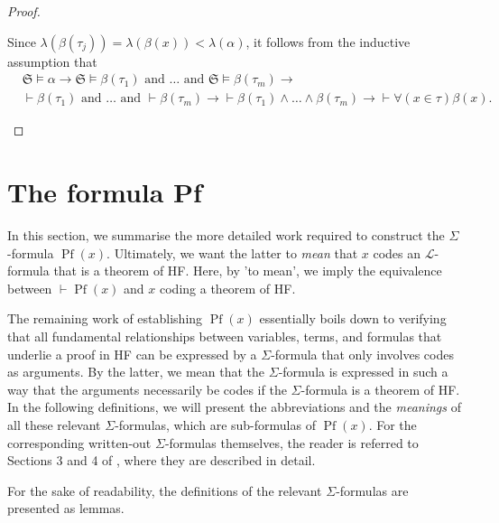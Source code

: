 \begin{proof}
\begin{itemize}
$$        $$
        Since $\lambda(\beta(\tau_j)) = \lambda(\beta(x)) < \lambda(\alpha)$, it follows 
        from the inductive assumption that
        \begin{equation*}
            \begin{split}
                & \mathfrak{S} \vDash \alpha \rightarrow 
                \mathfrak{S} \vDash \beta(\tau_1) \text{ and } \ldots \text{ and } 
                \mathfrak{S} \vDash \beta(\tau_m) \rightarrow \\
                &\vdash \beta(\tau_1) \text{ and } \ldots \text{ and } \vdash \beta(\tau_m) 
                \rightarrow
                \vdash \beta(\tau_1) \land \ldots \land \beta(\tau_m) \rightarrow
                \vdash \forall (x \in \tau) \beta(x).
            \end{split}
        \end{equation*}
    \end{itemize}
\end{proof}

\section{The formula Pf}

In this section, we summarise the more detailed work required to construct the 
$\Sigma$-formula $\operatorname{Pf}(x)$.
Ultimately, we want the latter to \textit{mean} that $x$ codes an $\mathcal{L}$-formula 
that is a theorem of HF.
Here, by 'to mean', we imply the equivalence between $\vdash \operatorname{Pf}(x)$ and
$x$ coding a theorem of HF.

The remaining work of establishing $\operatorname{Pf}(x)$ essentially boils down to verifying 
that all fundamental relationships between variables, terms, and formulas that 
underlie a proof in HF can be expressed by a $\Sigma$-formula that only involves codes as arguments.
By the latter, we mean that the $\Sigma$-formula is expressed in such a way that the arguments 
necessarily be codes if the $\Sigma$-formula is a theorem of HF.
In the following definitions, 
we will present the abbreviations and the \textit{meanings} of all these relevant 
$\Sigma$-formulas, which are sub-formulas of $\operatorname{Pf}(x)$.
For the corresponding written-out $\Sigma$-formulas themselves, the reader is
referred to Sections 3 and 4 of \cite{swierczkowski2003finite}, where they are described in detail.

For the sake of readability, the definitions of the relevant $\Sigma$-formulas are presented
as lemmas.

